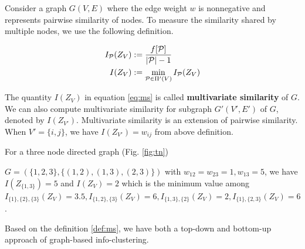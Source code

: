 \documentclass{article}
\begin{document}
Consider a graph $G(V, E)$ where the edge weight $w$ is nonnegative and represents pairwise similarity of nodes. To measure the similarity shared by multiple nodes, we use the following definition.
\begin{definition}\label{def:ms}
\begin{align}
I_{\mathcal{P}}(Z_V) & := \frac{ f[\mathcal{P}] }{  \lvert\mathcal{P}\rvert - 1 }\\
I(Z_V) & := \min_{\mathcal{P} \in \Pi'(V)} I_{\mathcal{P}}(Z_V)  \label{eq:ms}
\end{align}
\end{definition}
The quantity $I(Z_V)$ in equation \eqref{eq:ms} is called \textbf{multivariate similarity} of $G$. We can also compute multivariate similarity for subgraph $G'(V',E')$ of $G$, denoted by $I(Z_{V'})$. Multivariate similarity is an extension of pairwise similarity. When $V'=\{i,j\}$, we have $I(Z_{V'})=w_{ij}$ from above definition.
\begin{example}\label{eg:three}
For a three node directed graph (Fig. \ref{fig:tn}) 

$G=(\{1,2,3\},\{(1,2),(1,3),(2,3)\})$ with $w_{12}=w_{23}=1, w_{13}=5$, we have $I(Z_{\{1,3\}}) = 5$ and $I(Z_V) = 2$ which is the minimum value among $I_{\{1\},\{2\},\{3\}}(Z_V)=3.5, I_{\{1, 2\},\{3\}}(Z_V)=6, I_{\{1,3\},\{2\}}(Z_V)=2, I_{\{1\},\{2,3\}}(Z_V)=6$.
\end{example}

Based on the definition \eqref{def:ms}, we have both a top-down and bottom-up approach of graph-based info-clustering.
\end{document}
